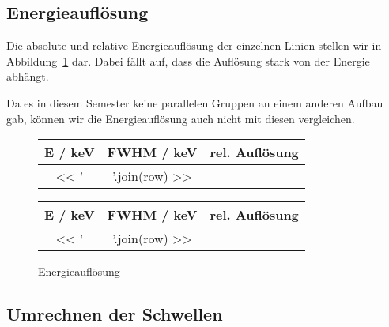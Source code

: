 \documentclass[11pt, ngerman, fleqn, DIV=15, headinclude, BCOR=2cm]{scrreprt}
\begin{document}
\subsection{Energieauflösung}

Die absolute und relative Energieauflösung der einzelnen Linien
stellen wir in Abbildung~\ref{tab:energieaufloesung} dar.
Dabei fällt auf, dass die Auflösung stark von der Energie abhängt.

Da es in diesem Semester keine parallelen Gruppen an einem anderen Aufbau gab,
können wir die Energieauflösung auch nicht mit diesen vergleichen.

\begin{figure}[h]
    \begin{minipage}[t]{0.45\textwidth}
	\centering
	\begin{tabular}{SSS}
		{E / \si{\kilo\electronvolt}} &
		{FWHM / \si{\kilo\electronvolt}} &
		{rel. Auflösung}\\
		\midrule
		<< ' & '.join(row) >> \\
	\end{tabular}
    \end{minipage}
    \hfill
    \begin{minipage}[t]{0.45\textwidth}
        \centering
        \begin{tabular}{SSS}
		{E / \si{\kilo\electronvolt}} &
		{FWHM / \si{\kilo\electronvolt}} &
		{rel. Auflösung}\\
		\midrule
		<< ' & '.join(row) >> \\
	\end{tabular}
    \end{minipage}
	\caption{%
		Energieauflösung
	}
	\label{tab:energieaufloesung}
\end{figure}


\subsection{Umrechnen der Schwellen}
\end{document}
